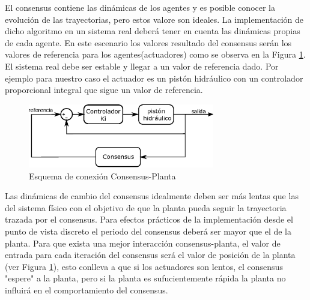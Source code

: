 

El consensus contiene las dinámicas de los agentes y es posible conocer la evolución de las trayectorias, pero estos valore son ideales. La implementación de dicho algoritmo en un sistema real deberá tener en cuenta las dinámicas propias de cada agente. En este escenario los valores resultado del consensus serán los valores de referencia para los agentes(actuadores) como se observa en la Figura \ref{fig_consensus_piston}. El sistema real debe ser estable y llegar a un valor de referencia dado. Por ejemplo para nuestro caso el actuador es un pistón hidráulico con un controlador proporcional integral que sigue un valor de referencia.

\begin{figure}[!h]
\centering
\includegraphics[width=3.2in]{imagenes/consensus_piston.eps}
\caption{Esquema de conexión Consensus-Planta}
\label{fig_consensus_piston}
\end{figure}

Las dinámicas de cambio del consensus idealmente deben ser más lentas que las del sistema físico con el objetivo de que la planta pueda seguir la trayectoria trazada por el consensus. Para efectos prácticos de la implementación desde el punto de vista discreto el periodo del consensus deberá ser mayor que el de la planta. Para que exista una mejor interacción consensus-planta, el valor de entrada para cada iteración del consensus será el valor de posición de la planta (ver Figura \ref{fig_consensus_piston}), esto conlleva a que si los actuadores son lentos, el consensus "espere" a la planta, pero si la planta es sufucientemente rápida la planta no influirá en el comportamiento del consensus.

